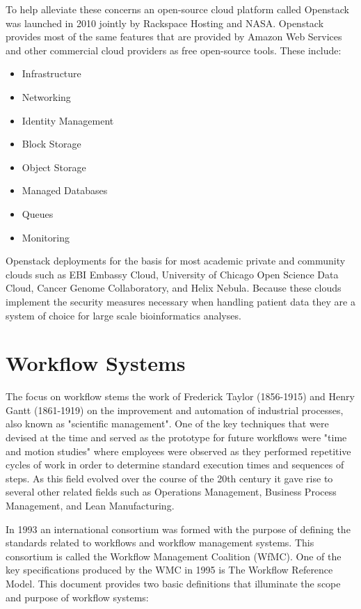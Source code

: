 To help alleviate these concerns an open-source cloud platform called Openstack was launched in 2010 jointly by Rackspace Hosting and NASA\autocite{sefraoui2012openstack}. Openstack provides most of the same features that are provided by Amazon Web Services and other commercial cloud providers as free open-source tools. These include:

\begin{itemize}
\item Infrastructure
\item Networking
\item Identity Management
\item Block Storage
\item Object Storage
\item Managed Databases
\item Queues
\item Monitoring
\end{itemize}

Openstack deployments for the basis for most academic private and community clouds such as EBI Embassy Cloud\autocite{cook2016european}, University of Chicago Open Science Data Cloud\autocite{grossman2010overview}, Cancer Genome Collaboratory\autocite{yung2016icgc}, and Helix Nebula\autocite{marx2013biology}. Because these clouds implement the security measures necessary when handling patient data they are a system of choice for large scale bioinformatics analyses.

\section{Workflow Systems}

The focus on workflow stems the work of Frederick Taylor (1856-1915) and Henry Gantt (1861-1919) on the improvement and automation of industrial processes, also known as "scientific management"\autocite{taylor2004scientific}. One of the key techniques that were devised at the time and served as the prototype for future workflows were "time and motion studies"\autocite{barnes1949motion} where employees were observed as they performed repetitive cycles of work in order to determine standard execution times and sequences of steps. As this field evolved over the course of the 20th century it gave rise to several other related fields such as Operations Management, Business Process Management, and Lean Manufacturing.

In 1993 an international consortium was formed with the purpose of defining the standards related to workflows and workflow management systems. This consortium is called the Workflow Management Coalition (WfMC). One of the key specifications produced by the WMC in 1995 is The Workflow Reference Model\autocite{hollingsworth1995workflow}. This document provides two basic definitions that illuminate the scope and purpose of  workflow systems:


